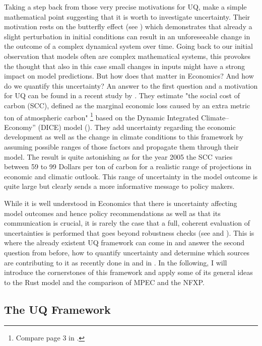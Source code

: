 Taking a step back from those very precise motivations for UQ, \cite{Smith.2019} make a simple mathematical point suggesting that it is worth to investigate uncertainty. Their motivation rests on the butterfly effect (see \cite{Lorenz.1963}) which demonstrates that already a slight perturbation in initial conditions can result in an unforeseeable change in the outcome of a complex dynamical system over time. Going back to our initial observation that models often are complex mathematical systems, this provokes the thought that also in this case small changes in inputs might have a strong impact on model predictions. But how does that matter in Economics? And how do we quantify this uncertainty? An answer to the first question and a motivation for UQ can be found in a recent study by \cite{Cai.2019}. They estimate "the social cost of carbon (SCC), defined as the marginal economic loss caused by an extra metric ton of atmospheric carbon" \footnote{ Compare page 3 in \cite{Cai.2019}.} based on the Dynamic Integrated Climate–Economy” (DICE) model (\cite{Nordhaus.1992, Nordhaus.2008}). They add uncertainty regarding the economic development as well as the change in climate conditions to this framework by assuming possible ranges of those factors and propagate them through their model. The result is quite astonishing as for the year 2005 the SCC varies between 59 to 99 Dollars per ton of carbon for a realistic range of projections in economic and climatic outlook. This range of uncertainty in the model outcome is quite large but clearly sends a more informative message to policy makers.

While it is well understood in Economics that there is uncertainty affecting model outcomes and hence policy recommendations as well as that its communication is crucial, it is rarely the case that a full, coherent evaluation of uncertainties is performed that goes beyond robustness checks (see \cite{Manski.2019} and \cite{Scheidegger.2019}). This is where the already existent UQ framework can come in and answer the second question from before, how to quantify uncertainty and determine which sources are contributing to it as recently done in \cite{Scheidegger.2019} and in \cite{Harenberg.2019}. In the following, I will introduce the cornerstones of this framework and apply some of its general ideas to the Rust model and the comparison of MPEC and the NFXP.

\subsection{The UQ Framework}

